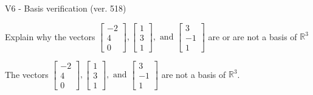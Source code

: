 \begin{exercise}
  \begin{exerciseTitle}V6 - Basis verification (ver. 518)\end{exerciseTitle}
  \begin{exerciseStatement}
    Explain why the vectors \(\left[\begin{array}{r}
-2 \\
4 \\
0
\end{array}\right] , \left[\begin{array}{r}
1 \\
3 \\
1
\end{array}\right] , \text{ and } \left[\begin{array}{r}
3 \\
-1 \\
1
\end{array}\right]\) are or are not a basis of \(\mathbb{R}^3\)	


  \end{exerciseStatement}
  \begin{exerciseAnswer}
   The vectors \(\left[\begin{array}{r}
-2 \\
4 \\
0
\end{array}\right] , \left[\begin{array}{r}
1 \\
3 \\
1
\end{array}\right] , \text{ and } \left[\begin{array}{r}
3 \\
-1 \\
1
\end{array}\right]\) 
  	 are not  a basis of \(\mathbb{R}^3\).
  


  \end{exerciseAnswer}
\end{exercise}